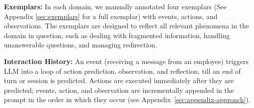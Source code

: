 \textbf{Exemplars:} In each domain, we manually annotated four exemplars (See Appendix \ref{sec:exemplars} for a full exemplar) with events, actions, and observations. The exemplars are designed to reflect all relevant phenomena in the domain in question, such as dealing with fragmented information, handling unanswerable questions, and managing redirection. %

\textbf{Interaction History:} An event (receiving a message from an employee) triggers LLM into a loop of action prediction, observation, and reflection, till an end of turn or session is predicted. 
Actions are executed immediately after they are predicted;
events, action, and observation are incrementally appended in the prompt in the order in which they occur (see Appendix~\ref{sec:appendix-approach}).



